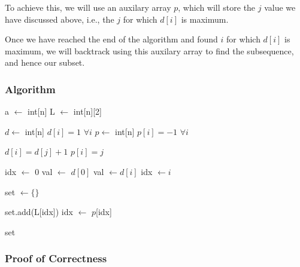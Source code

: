 \documentclass[12pt]{article}
\begin{document}
To achieve this, we will use an auxilary array $p$, which will store the $j$ value we have discussed above, i.e., the $j$ for which $d[i]$ is maximum.

Once we have reached the end of the algorithm and found $i$ for which $d[i]$ is maximum, we will backtrack using this auxilary array to find the subsequence, and hence our subset.

\subsubsection{Algorithm}

\begin{algorithm}
    \begin{algorithmic}[1]
        \Require a $\leftarrow$ int[n]
        \Require L $\leftarrow$ int[n][2] 

        
        \State $d \leftarrow$ int[n]
        \State $d[i] = 1$ $\forall i$
        \State $p \leftarrow$ int[n]
        \State $p[i] = -1$ $\forall i$

         
                    \State $d[i] = d[j] + 1$
                    \State $p[i] = j$
                \EndIf
            \EndFor
        \EndFor

        \State idx $\leftarrow$ 0
        \State val $\leftarrow$ $d[0]$
           
                \State val $\leftarrow d[i]$
                \State idx $\leftarrow i$
            \EndIf
        \EndFor

        \State set $\leftarrow \{\}$ 

            \State set.add(L[idx])
            \State idx $\leftarrow$ $p$[idx] 
    
        \EndWhile

        \Return set
    \end{algorithmic}
\end{algorithm}


\subsubsection{Proof of Correctness}
\end{document}
